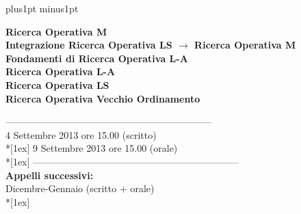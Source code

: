 \textwidth 500pt
\textheight 9.0in
\voffset=-1.0cm
\hoffset=-2.3cm
\parskip=10pt plus1pt minus1pt

\pagestyle{empty}
\baselineskip=14pt
\large

\noindent
{\bf
Ricerca Operativa M\\
Integrazione Ricerca Operativa LS $\rightarrow$ Ricerca Operativa M\\
Fondamenti di Ricerca Operativa L-A\\
Ricerca Operativa L-A\\
Ricerca Operativa LS\\
Ricerca Operativa Vecchio Ordinamento
}

\noindent 
-----------------------------------------------------------------\\
4 Settembre 2013 ore 15.00 (scritto)\\*[1ex]
9 Settembre 2013 ore 15.00 (orale)\\*[1ex]
-----------------------------------------------------------------\\

\noindent
{\bf Appelli successivi:}\\
Dicembre-Gennaio (scritto + orale)\\*[1ex]

